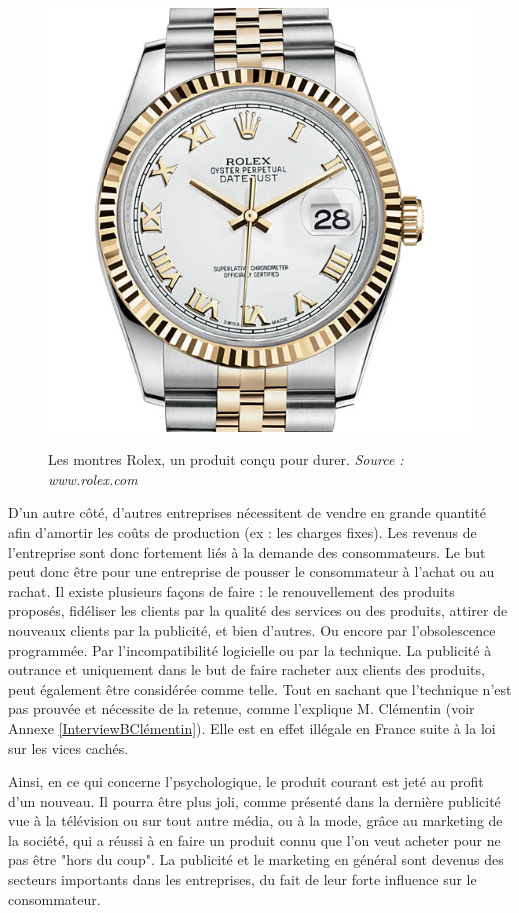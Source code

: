 \begin{figure}
~\includegraphics[scale=0.2]{Rsc/montre_rolex.jpg} 
\caption{Les montres Rolex, un produit conçu pour durer. \textit{Source : www.rolex.com}}
\label{Rolex}
\end{figure} 

\bigbreak
D'un autre côté, d'autres entreprises nécessitent de vendre en grande quantité afin d'amortir les coûts de production (ex : les charges fixes). Les revenus de l'entreprise sont donc fortement liés à la demande des consommateurs. Le but peut donc être pour une entreprise de pousser le consommateur à l'achat ou au rachat. Il existe plusieurs façons de faire :  le renouvellement des produits proposés, fidéliser les clients par la qualité des services ou des produits, attirer de nouveaux clients par la publicité, et bien d'autres. Ou encore par l'obsolescence programmée. Par l'incompatibilité logicielle ou par la technique. La publicité à outrance et uniquement dans le but de faire racheter aux clients des produits, peut également être considérée comme telle. Tout en sachant que l'\op technique n'est pas prouvée et nécessite de la retenue, comme l'explique M. Clémentin (voir Annexe \ref{InterviewBClémentin}). Elle est en effet illégale en France suite à la loi sur les vices cachés.

\bigbreak
Ainsi, en ce qui concerne l'\op psychologique, le produit courant est jeté au profit d'un nouveau. Il pourra être plus joli, comme présenté dans la dernière publicité vue à la télévision ou sur tout autre média, ou à la mode, grâce au marketing de la société, qui a réussi à en faire un produit connu que l'on veut acheter pour ne pas être "hors du coup". La publicité et le marketing en général sont devenus des secteurs importants dans les entreprises, du fait de leur forte influence sur le consommateur.

